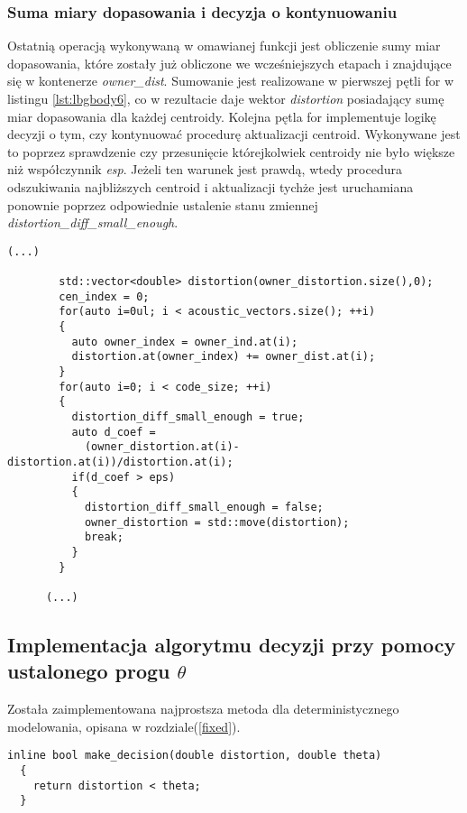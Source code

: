 \subsubsection{Suma miary dopasowania i decyzja o kontynuowaniu}
Ostatnią operacją wykonywaną w omawianej funkcji jest obliczenie sumy miar dopasowania, które zostały już obliczone we wcześniejszych etapach i znajdujące się w kontenerze \textit{owner\_dist}. Sumowanie jest realizowane w pierwszej pętli for w listingu {\ref{lst:lbgbody6}}, co w rezultacie daje wektor \textit{distortion} posiadający sumę miar dopasowania dla każdej centroidy. Kolejna pętla for implementuje logikę decyzji o tym, czy kontynuować procedurę aktualizacji centroid. Wykonywane jest to
poprzez sprawdzenie czy przesunięcie którejkolwiek centroidy nie było większe niż współczynnik \textit{esp}. Jeżeli ten warunek jest prawdą, wtedy procedura odszukiwania najbliższych centroid i aktualizacji tychże jest uruchamiana ponownie poprzez odpowiednie ustalenie stanu zmiennej \textit{distortion\_diff\_small\_enough}.
\begin{lstlisting}[style=lst:cpp, caption=Funkcja \textit{lbg}\label{lst:lbgbody6} - decyzja o kontynuowaniu]
      (...)

        std::vector<double> distortion(owner_distortion.size(),0);
        cen_index = 0;
        for(auto i=0ul; i < acoustic_vectors.size(); ++i)
        {
          auto owner_index = owner_ind.at(i);
          distortion.at(owner_index) += owner_dist.at(i);
        }
        for(auto i=0; i < code_size; ++i)
        {
          distortion_diff_small_enough = true;
          auto d_coef =
            (owner_distortion.at(i)-distortion.at(i))/distortion.at(i); 
          if(d_coef > eps)
          {
            distortion_diff_small_enough = false;
            owner_distortion = std::move(distortion);
            break;
          }
        }

      (...)
\end{lstlisting}

\subsection{Implementacja algorytmu decyzji przy pomocy ustalonego progu $\theta$}

Została zaimplementowana najprostsza metoda dla deterministycznego modelowania, opisana w rozdziale({\ref{fixed}}).

\begin{lstlisting}[style=lst:cpp, caption=Funkcja \textit{make\_decision}\label{lst:dec} - decyzja o kontynuowaniu]
  inline bool make_decision(double distortion, double theta)
  {
    return distortion < theta;
  }

\end{lstlisting}

